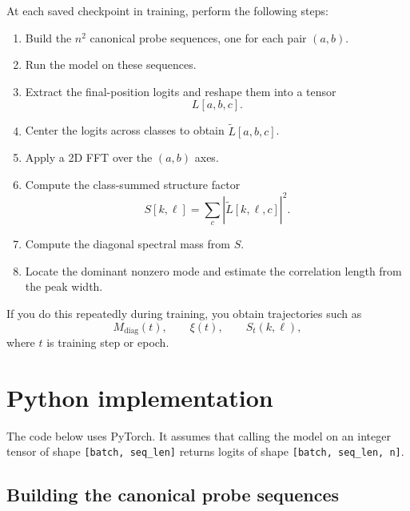 \documentclass[11pt]{article}
\newcommand{\diag}{\mathrm{diag}}
\begin{document}
At each saved checkpoint in training, perform the following steps:
\begin{enumerate}
    \item Build the $n^2$ canonical probe sequences, one for each pair $(a,b)$.
    \item Run the model on these sequences.
    \item Extract the final-position logits and reshape them into a tensor
    \begin{equation}
        L[a,b,c].
    \end{equation}
    \item Center the logits across classes to obtain $\widetilde{L}[a,b,c]$.
    \item Apply a 2D FFT over the $(a,b)$ axes.
    \item Compute the class-summed structure factor
    \begin{equation}
        S[k,\ell] = \sum_c \left|\widehat{\widetilde{L}}[k,\ell,c]\right|^2.
    \end{equation}
    \item Compute the diagonal spectral mass from $S$.
    \item Locate the dominant nonzero mode and estimate the correlation length from the peak width.
\end{enumerate}

If you do this repeatedly during training, you obtain trajectories such as
\begin{equation}
    M_{\diag}(t), \qquad \xi(t), \qquad S_t(k,\ell),
\end{equation}
where $t$ is training step or epoch.

\section{Python implementation}

The code below uses PyTorch. It assumes that calling the model on an integer tensor of shape \texttt{[batch, seq\_len]} returns logits of shape \texttt{[batch, seq\_len, n]}.

\subsection{Building the canonical probe sequences}
\end{document}
